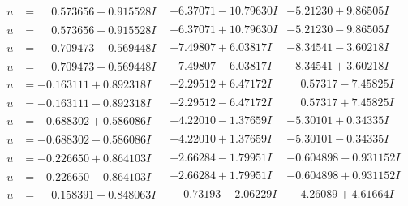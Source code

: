 \documentclass[1p]{elsarticle_modified}
\theoremstyle{definition}
\begin{document}
$$\begin{array}{c|c|c}
\begin{aligned}
u &= \phantom{-}0.573656 + 0.915528 I\end{aligned}
 & -6.37071 - 10.79630 I & -5.21230 + 9.86505 I \\ \hline\begin{aligned}
u &= \phantom{-}0.573656 - 0.915528 I\end{aligned}
 & -6.37071 + 10.79630 I & -5.21230 - 9.86505 I \\ \hline\begin{aligned}
u &= \phantom{-}0.709473 + 0.569448 I\end{aligned}
 & -7.49807 + 6.03817 I & -8.34541 - 3.60218 I \\ \hline\begin{aligned}
u &= \phantom{-}0.709473 - 0.569448 I\end{aligned}
 & -7.49807 - 6.03817 I & -8.34541 + 3.60218 I \\ \hline\begin{aligned}
u &= -0.163111 + 0.892318 I\end{aligned}
 & -2.29512 + 6.47172 I & \phantom{-}0.57317 - 7.45825 I \\ \hline\begin{aligned}
u &= -0.163111 - 0.892318 I\end{aligned}
 & -2.29512 - 6.47172 I & \phantom{-}0.57317 + 7.45825 I \\ \hline\begin{aligned}
u &= -0.688302 + 0.586086 I\end{aligned}
 & -4.22010 - 1.37659 I & -5.30101 + 0.34335 I \\ \hline\begin{aligned}
u &= -0.688302 - 0.586086 I\end{aligned}
 & -4.22010 + 1.37659 I & -5.30101 - 0.34335 I \\ \hline\begin{aligned}
u &= -0.226650 + 0.864103 I\end{aligned}
 & -2.66284 - 1.79951 I & -0.604898 - 0.931152 I \\ \hline\begin{aligned}
u &= -0.226650 - 0.864103 I\end{aligned}
 & -2.66284 + 1.79951 I & -0.604898 + 0.931152 I \\ \hline\begin{aligned}
u &= \phantom{-}0.158391 + 0.848063 I\end{aligned}
 & \phantom{-}0.73193 - 2.06229 I & \phantom{-}4.26089 + 4.61664 I \\ \hline\begin{aligned}

\end{aligned}
\end{array}$$
\end{document}

